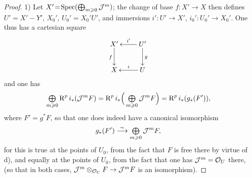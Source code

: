 \begin{proof}
1) Let $X'\!=\!\operatorname{Spec}(\bigoplus_{m\geqslant 0}{\mathcal J}^m)$; the change of base \hbox{$f:X'\!\to\! X$} then defines $U'=X'- Y'$, $X_0'$, $U_0'=X_0' U'$, and immersions $i'\colon U'\to X'$, \hbox{$i_0':U_0'\to X_0'$}. One thus has a cartesian square
\[
\xymatrix{
X'\ar[d]_f&\ar[l]_-{i'} U'\ar[d]^g \\
X&\ar[l]_-{i} U
}
\]
and one has
\steco
\begin{equation} \label{eq:XII.19}
\mathop{\textstyle\bigoplus}\limits_{m\geqslant 0}\operatorname{R}^pi_\ast({\mathcal J}^mF) = \operatorname{R}^pi_\ast \Big(\mathop{\textstyle\bigoplus}\limits_{m\geqslant 0} {\mathcal J}^mF \Big) =\operatorname{R}^pi_\ast (g_\ast(F')),
\end{equation}
where $F'=g^\ast F$, so that one does indeed have a canonical isomorphism
\[
g_\ast(F') \overset{\sim}{\longrightarrow} \mathop{\textstyle\bigoplus}\limits_{m\geqslant 0}{\mathcal J}^mF,
\]
for this is true at the points of $U_0$, from the fact that $F$ is free there by virtue of d), and equally at the points of $U_0$, from the fact that one has ${\mathcal J}^m={\mathcal O}_U$ there, (so that in both cases, $\Jj^m\otimes_{\Oo_U}F\to \Jj^mF$ is an isomorphism).


\end{proof}
